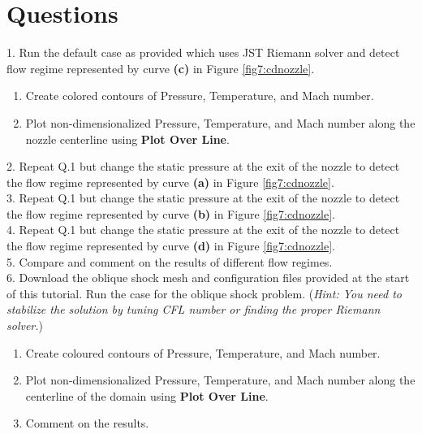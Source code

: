 \section{Questions}
1. Run the default case as provided which uses JST Riemann solver and detect flow regime represented by curve \textbf{(c)} in Figure \ref{fig7:cdnozzle}.
\begin{enumerate}[label=(\alph*)]
	\item Create colored contours of Pressure, Temperature, and Mach number.
	\item Plot non-dimensionalized Pressure, Temperature, and Mach number along the nozzle centerline using \textbf{Plot Over Line}.
\end{enumerate}
2. Repeat Q.1 but change the static pressure at the exit of the nozzle to detect the flow regime represented by curve \textbf{(a)} in Figure \ref{fig7:cdnozzle}.\\
3. Repeat Q.1 but change the static pressure at the exit of the nozzle to detect the flow regime represented by curve \textbf{(b)} in Figure \ref{fig7:cdnozzle}.\\
4. Repeat Q.1 but change the static pressure at the exit of the nozzle to detect the flow regime represented by curve \textbf{(d)} in Figure \ref{fig7:cdnozzle}.\\
5. Compare and comment on the results of different flow regimes.\\
6. Download the oblique shock mesh and configuration files provided at the start of this tutorial. Run the case for the oblique shock problem.
(\textit{Hint: You need to stabilize the solution by tuning CFL number or finding the proper Riemann solver.})
\begin{enumerate}[label=(\alph*)]
	\item Create coloured contours of Pressure, Temperature, and Mach number.
	\item Plot non-dimensionalized Pressure, Temperature, and Mach number along the centerline of the domain using \textbf{Plot Over Line}.
	\item Comment on the results.
\end{enumerate}


